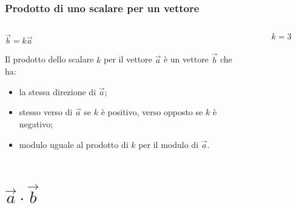 \documentclass[]{beamer}
\begin{document}
\begin{frame}
  \frametitle{Prodotto di uno scalare per un vettore}
  
\begin{columns}
\begin{column}{0.7\textwidth}

\begin{center}
\colorbox{marroncino!30}{ $ \vec{b} = k\vec{a} $ }
\end{center}
  Il prodotto dello scalare $ k $ per il vettore $ \vec{a} $ è un vettore $ \vec{b} $ che ha:
  \begin{itemize}
    \item la stessa direzione di $ \vec{a} $;\pause
    \item stesso verso di $ \vec{a} $ se $ k $ è positivo, verso opposto se $ k $ è negativo;\pause
    \item modulo uguale al prodotto di $ k $ per il modulo di $ \vec{a} $.
  \end{itemize}

\end{column}
\begin{column}{0.3\textwidth}

\begin{figure}

$ k=3 $
\end{figure}

\end{column}
\end{columns}
\end{frame}








\section{$ \vec{a}\cdot\vec{b} $}
\end{document}
